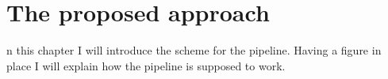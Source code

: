 
%
%
\let\textcircled=\pgftextcircled
\chapter{The proposed approach}
\label{chap:prop}

n this chapter I will introduce the scheme for the pipeline. Having a figure in place I will explain how the pipeline is supposed to work.